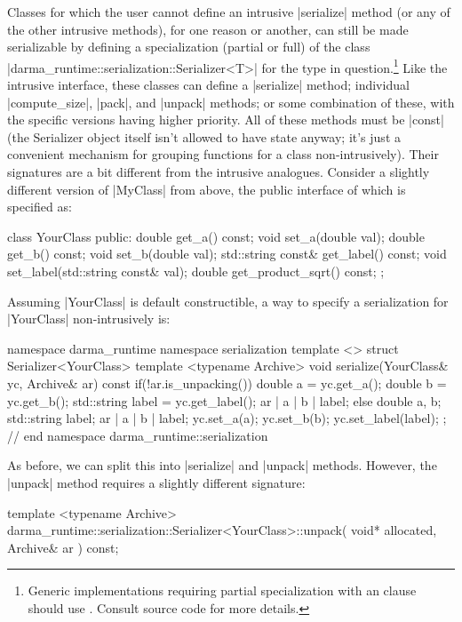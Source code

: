 Classes for which the user cannot define an intrusive |serialize| method (or
any of the other intrusive methods), for one reason or another, can still be
made serializable by defining a specialization (partial or full) of the class
|darma_runtime::serialization::Serializer<T>| for the type in
question.\footnote{Generic implementations requiring partial specialization
  with an  clause should use
.  Consult source code for more details.}  Like the intrusive interface,
these classes can define a |serialize| method; individual |compute_size|,
|pack|, and |unpack| methods; or some combination of these, with the specific
versions having higher priority.  All of these methods must be |const| (the
Serializer object itself isn't allowed to have state anyway; it's just a
convenient mechanism for grouping functions for a class non-intrusively).  Their
signatures are a bit different from the intrusive analogues.  Consider a
slightly different version of |MyClass| from above, the public
interface of which is specified as:
\begin{CppCodeNumb}
class YourClass {
  public:
    double get_a() const;
    void set_a(double val);
    double get_b() const;
    void set_b(double val);
    std::string const& get_label() const;
    void set_label(std::string const& val);
    double get_product_sqrt() const;
};
\end{CppCodeNumb}
Assuming |YourClass| is default constructible, a way to specify a serialization
for |YourClass| non-intrusively is:
\begin{CppCodeNumb}
namespace darma_runtime { namespace serialization {
template <>
struct Serializer<YourClass> {
  template <typename Archive>
  void serialize(YourClass& yc, Archive& ar) const {
    if(!ar.is_unpacking()) {
      double a = yc.get_a();
      double b = yc.get_b();
      std::string label = yc.get_label();
      ar | a | b | label;
    }
    else {
      double a, b;
      std::string label;
      ar | a | b | label;
      yc.set_a(a);
      yc.set_b(b);
      yc.set_label(label);
    }
  }
};
}} // end namespace darma_runtime::serialization
\end{CppCodeNumb}
As before, we can split this into |serialize| and |unpack| methods.  However,
the |unpack| method requires a slightly different signature:
\begin{CppCodeNumb}
template <typename Archive>
darma_runtime::serialization::Serializer<YourClass>::unpack(
  void* allocated, Archive& ar
) const;
\end{CppCodeNumb}
